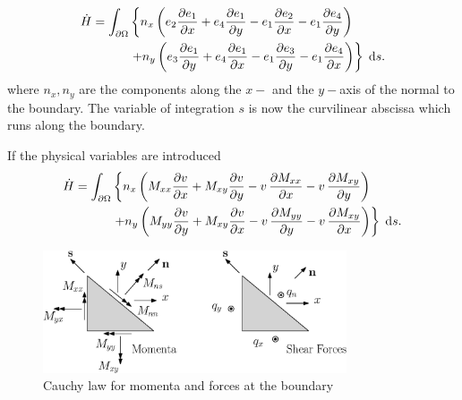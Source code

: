 \documentclass[preprint,12pt]{elsarticle}
\begin{document}
	\begin{align}
	\dot{H} = \int_{\partial \Omega}  & \left\{  n_x \left(e_2 \diffp{e_1}{x}  + e_4 \diffp{e_1}{y}  - e_1 \diffp{e_2}{x} - e_1 \diffp{e_4}{y}\right)
	\right. \nonumber \\
	&   \left. +n_y \left(e_3 \diffp{e_1}{y} + e_4 \diffp{e_1}{x} - e_1 \diffp{e_3}{y} - e_1 \diffp{e_4}{x} \right) \right\} \d{s}.
	\end{align}
	where $n_x, n_y$ are the components along the $x-$ and the $y-$axis of the normal to the boundary. The variable of integration $s$ is now the curvilinear abscissa which runs along the boundary. 

	
	If the physical variables are introduced 
	\begin{align}
	\dot{H} = \int_{\partial \Omega}  & \left\{  n_x \left(M_{xx} \diffp{v}{x} + M_{xy} \diffp{v}{y} - v \, \diffp{M_{xx} }{x}   - v \, \diffp{M_{xy}}{y}\right)
	\right.  \nonumber\\
	&  \left. +n_y \left(M_{yy} \diffp{v}{y} + M_{xy} \diffp{v}{x} - v \, \diffp{M_{yy}}{y} - v\, \diffp{M_{xy}}{x} \right) \right\} \d{s}.
	\end{align}
	
	\begin{figure}
		\centering
		\includegraphics[width=0.8\textwidth]{Cauchy_law.eps}
		\caption{Cauchy law for momenta and forces at the boundary}
		\label{fig:Cauchy_law}
	\end{figure}
	
\end{document}
